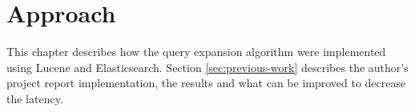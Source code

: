 \chapter{Approach}
\label{ch:approach}
This chapter describes how the query expansion algorithm were implemented using Lucene and Elasticsearch.
Section \ref{sec:previous-work} describes the author's project report \cite{project-report} implementation,
the results and what can be improved to decrease the latency.



